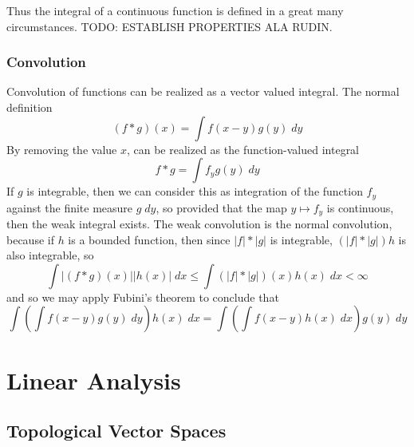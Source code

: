 Thus the integral of a continuous function is defined in a great many circumstances. TODO: ESTABLISH PROPERTIES ALA RUDIN.

\section{Convolution}

Convolution of functions can be realized as a vector valued integral. The normal definition
%
\[ (f * g)(x) = \int f(x - y) g(y)\; dy \]
%
By removing the value $x$, can be realized as the function-valued integral
%
\[ f * g = \int f_y g(y)\; dy \]
%
If $g$ is integrable, then we can consider this as integration of the function $f_y$ against the finite measure $g\; dy$, so provided that the map $y \mapsto f_y$ is continuous, then the weak integral exists. The weak convolution is the normal convolution, because if $h$ is a bounded function, then since $|f| * |g|$ is integrable, $(|f| * |g|)h$ is also integrable, so
%
\[ \int |(f * g)(x)| |h(x)|\; dx \leq \int (|f| * |g|)(x) h(x)\; dx < \infty \]
%
and so we may apply Fubini's theorem to conclude that
%
\[ \int \left( \int f(x-y) g(y)\; dy \right) h(x)\; dx = \int \left( \int f(x-y) h(x)\; dx \right) g(y)\; dy \]
%











\part{Linear Analysis}

\chapter{Topological Vector Spaces}

